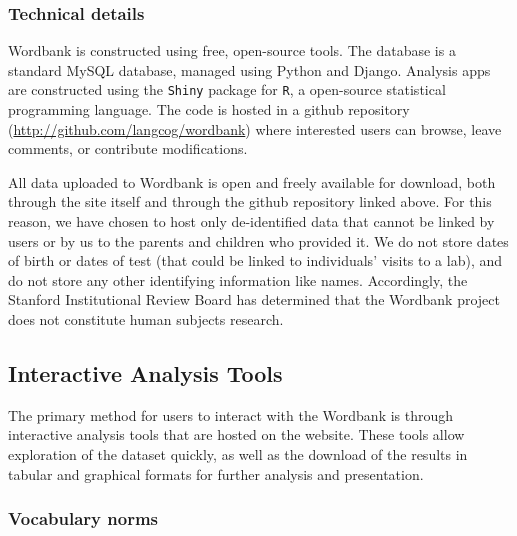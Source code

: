 \documentclass[doc,noapacite]{apa2}
\newcommand{\comment}[1]{\marginpar[]{\small \textcolor{blue}{#1}}}
\begin{document}
\subsubsection{Technical details}

Wordbank is constructed using free, open-source tools. The database is a standard MySQL database, managed using Python and Django. Analysis apps are constructed using the \texttt{Shiny} package for \texttt{R}, a open-source statistical programming language.  The code is hosted in a github repository (\url{http://github.com/langcog/wordbank}) where interested users can browse, leave comments, or contribute modifications. 


All data uploaded to Wordbank is open and freely available for download, both through the site itself and through the github repository linked above. For this reason, we have chosen to host only de-identified data that cannot be linked by users or by us to the parents and children who provided it. We do not store dates of birth or dates of test (that could be linked to individuals' visits to a lab), and do not store any other identifying information like names. Accordingly, the Stanford Institutional Review Board has determined that the Wordbank project does not constitute human subjects research. \comment{Is this enough?}

\subsection{Interactive Analysis Tools}

The primary method for users to interact with the Wordbank is through interactive analysis tools that are hosted on the website. These tools allow exploration of the dataset quickly, as well as the download of the results in tabular and graphical formats for further analysis and presentation. 

\subsubsection{Vocabulary norms}
\end{document}

